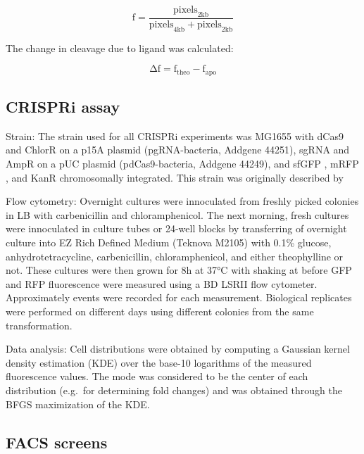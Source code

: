 \documentclass[10pt,oneside]{article}
\begin{document}
\begin{displaymath}
 \mathrm{f} = \frac{\mathrm{pixels}_\mathrm{2kb}}{\mathrm{pixels}_\mathrm{4kb} + \mathrm{pixels}_\mathrm{2kb}}
\end{displaymath}

The change in cleavage due to ligand was calculated: 

\begin{displaymath}
 \mathrm{Δf} = \mathrm{f}_\mathrm{theo} - \mathrm{f}_\mathrm{apo}
\end{displaymath}

\subsection{CRISPRi assay}

Strain: The strain used for all CRISPRi experiments was \ecoli{} MG1655 with dCas9 and ChlorR on a p15A plasmid (pgRNA-bacteria, Addgene 44251), sgRNA and AmpR on a pUC plasmid (pdCas9-bacteria, Addgene 44249), and sfGFP \autocite{pedelacq2006}, mRFP \autocite{campbell2002}, and KanR chromosomally integrated.  This strain was originally described by 

Flow cytometry: Overnight cultures were innoculated from freshly picked colonies in  LB with  carbenicillin and  chloramphenicol.  The next morning, fresh cultures were innoculated in  culture tubes or 24-well blocks by transferring  of overnight culture into  EZ Rich Defined Medium (Teknova M2105) with 0.1\% glucose,  an\-hydro\-tetra\-cycline,  carbenicillin,  chloramphenicol, and either  theophylline or not.  These cultures were then grown for 8h at 37°C with shaking at  before GFP and RFP fluorescence were measured using a BD LSRII flow cytometer.  Approximately \unit[10,000]{events} were recorded for each measurement.  Biological replicates were performed on different days using different colonies from the same transformation.

Data analysis: Cell distributions were obtained by computing a Gaussian kernel density estimation (KDE) over the base-10 logarithms of the measured fluorescence values.  The mode was considered to be the center of each distribution (e.g.\ for determining fold changes) and was obtained through the BFGS maximization of the KDE.

\subsection{FACS screens}
\end{document}
